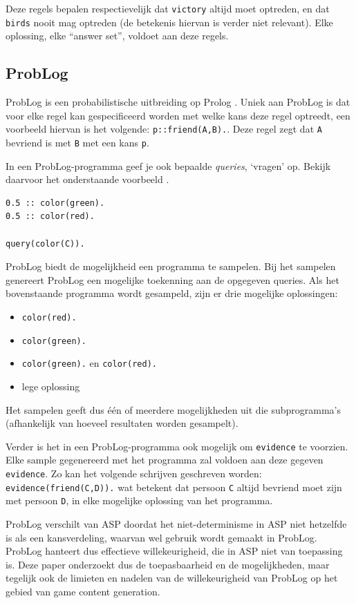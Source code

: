 \documentclass{article}
\begin{document}
Deze regels bepalen respectievelijk dat \texttt{victory} altijd moet optreden, en dat \texttt{birds} nooit mag optreden (de betekenis hiervan is verder niet relevant). Elke oplossing, elke ``answer set'', voldoet aan deze regels.
	\subsection{ProbLog}
	ProbLog is een probabilistische uitbreiding op Prolog \cite{raedt07problog}. Uniek aan ProbLog is dat voor elke regel kan gespecificeerd worden met welke kans deze regel optreedt, een voorbeeld hiervan is het volgende: \texttt{p::friend(A,B).}. Deze regel zegt dat \texttt{A} bevriend is met \texttt{B} met een kans \texttt{p}.

In een ProbLog-programma geef je ook bepaalde \textit{queries}, `vragen' op. Bekijk daarvoor het onderstaande voorbeeld . 
	\begin{lstlisting}[language=Prolog-pretty]
0.5 :: color(green).
0.5 :: color(red).

query(color(C)).
\end{lstlisting}

ProbLog biedt de mogelijkheid een programma te sampelen. Bij het sampelen genereert ProbLog een mogelijke toekenning aan de opgegeven queries. Als het bovenstaande programma wordt gesampeld, zijn er drie mogelijke oplossingen:
\begin{itemize}
\item \texttt{color(red).}
\item \texttt{color(green).}
\item \texttt{color(green).} en \texttt{color(red).}
\item lege oplossing
\end{itemize}
	
	Het sampelen geeft dus \'e\'en of meerdere mogelijkheden uit die subprogramma's (afhankelijk van hoeveel resultaten worden gesampelt).

 Verder is het in een ProbLog-programma ook mogelijk om \texttt{evidence} te voorzien. Elke sample gegenereerd met het programma zal voldoen aan deze gegeven \texttt{evidence}. Zo kan het volgende schrijven geschreven worden: \texttt{evidence(friend(C,D)).} wat betekent dat persoon \texttt{C} altijd bevriend moet zijn met persoon \texttt{D}, in elke mogelijke oplossing van het programma.


ProbLog verschilt van ASP doordat het niet-determinisme in ASP niet hetzelfde is als een kansverdeling, waarvan wel gebruik wordt gemaakt in ProbLog. ProbLog hanteert dus effectieve willekeurigheid, die in ASP niet van toepassing is. Deze paper onderzoekt dus de toepasbaarheid en de mogelijkheden, maar tegelijk ook de limieten en nadelen van de willekeurigheid van ProbLog op het gebied van game content generation.
\end{document}
